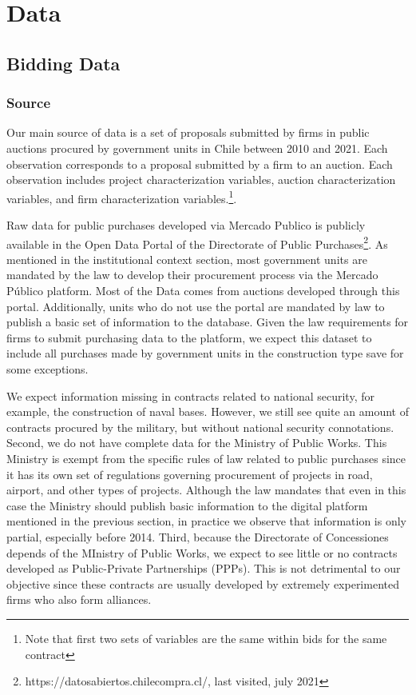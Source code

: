 
\chapter{Data}

\section{Bidding Data}
\subsection{Source}
Our main source of data is a set of proposals submitted by firms in public auctions procured by government units in Chile between 2010 and 2021. Each observation corresponds to a proposal submitted by a firm to an auction. Each observation includes project characterization variables, auction characterization variables, and firm characterization variables.\footnote{Note that first two sets of variables are the same within bids for the same contract}.

Raw data for public purchases developed via Mercado Publico is publicly available in the Open Data Portal of the Directorate of Public Purchases\footnote{https://datosabiertos.chilecompra.cl/, last visited, july 2021}. As mentioned in the institutional context section, most government units are mandated by the law to develop their procurement process via the Mercado Público platform. Most of the Data comes from auctions developed through this portal. Additionally, units who do not use the portal are mandated by law to publish a basic set of information to the database. Given the law requirements for firms to submit purchasing data to the platform, we expect this dataset to include all purchases made by government units in the construction type save for some exceptions.

We expect information missing in contracts related to national security, for example, the construction of naval bases. However, we still see quite an amount of contracts procured by the military, but without national security connotations. Second, we do not have complete data for the Ministry of Public Works. This Ministry is exempt from the specific rules of law related to public purchases since it has its own set of regulations governing procurement of projects in road, airport, and other types of projects. Although the law mandates that even in this case the Ministry should publish basic information to the digital platform mentioned in the previous section, in practice we observe that information is only partial, especially before 2014. Third, because the Directorate of Concessiones depends of the MInistry of Public Works, we expect to see little or no contracts developed as Public-Private Partnerships (PPPs). This is not detrimental to our objective since these contracts are usually developed by extremely experimented firms who also form alliances.

